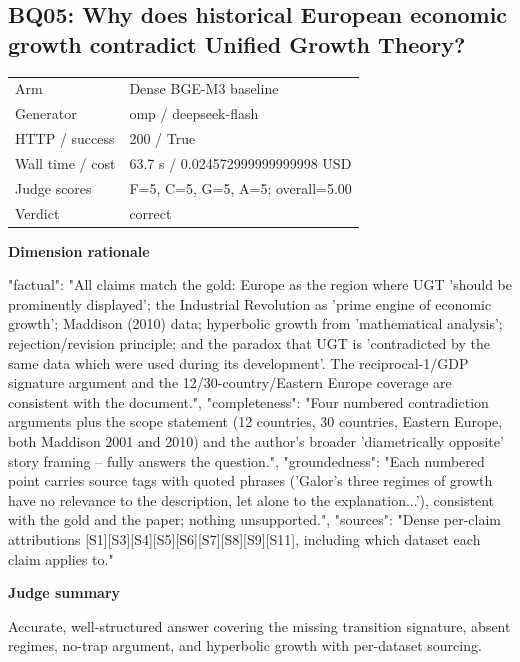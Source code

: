 \documentclass[10pt]{article}
\begin{document}
\subsection{BQ05: Why does historical European economic growth contradict Unified Growth Theory?}
\begin{tabular}{@{}ll@{}}
Arm & Dense BGE-M3 baseline\\
Generator & omp / deepseek-flash\\
HTTP / success & 200 / True\\
Wall time / cost & 63.7 s / 0.024572999999999998 USD\\
Judge scores & F=5, C=5, G=5, A=5; overall=5.00\\
Verdict & correct\\
\end{tabular}

\textbf{Dimension rationale}
\begin{EvidenceText}
{
  "factual": "All claims match the gold: Europe as the region where UGT 'should be prominently displayed'; the Industrial Revolution as 'prime engine of economic growth'; Maddison (2010) data; hyperbolic growth from 'mathematical analysis'; rejection/revision principle; and the paradox that UGT is 'contradicted by the same data which were used during its development'. The reciprocal-1/GDP signature argument and the 12/30-country/Eastern Europe coverage are consistent with the document.",
  "completeness": "Four numbered contradiction arguments plus the scope statement (12 countries, 30 countries, Eastern Europe, both Maddison 2001 and 2010) and the author's broader 'diametrically opposite' story framing -- fully answers the question.",
  "groundedness": "Each numbered point carries source tags with quoted phrases ('Galor's three regimes of growth have no relevance to the description, let alone to the explanation...'), consistent with the gold and the paper; nothing unsupported.",
  "sources": "Dense per-claim attributions [S1][S3][S4][S5][S6][S7][S8][S9][S11], including which dataset each claim applies to."
}
\end{EvidenceText}

\textbf{Judge summary}
\begin{EvidenceText}
Accurate, well-structured answer covering the missing transition signature, absent regimes, no-trap argument, and hyperbolic growth with per-dataset sourcing.
\end{EvidenceText}
\end{document}
